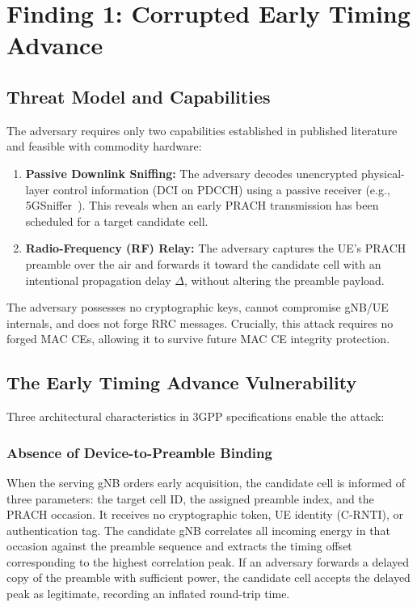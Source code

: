 \chapter{Finding 1: Corrupted Early Timing Advance}
\label{ch:m1}

\section{Threat Model and Capabilities}
\label{sec:threat}

The adversary requires only two capabilities established in published literature and feasible with
commodity hardware:
\begin{enumerate}\itemsep2pt
  \item \textbf{Passive Downlink Sniffing:} The adversary decodes unencrypted physical-layer control
        information (DCI on PDCCH) using a passive receiver (e.g., 5GSniffer~\cite{ludant2023sniffing}).
        This reveals when an early PRACH transmission has been scheduled for a target candidate cell.
  \item \textbf{Radio-Frequency (RF) Relay:} The adversary captures the UE's PRACH preamble over the air
        and forwards it toward the candidate cell with an intentional propagation delay $\Delta$, without
        altering the preamble payload.
\end{enumerate}
The adversary possesses no cryptographic keys, cannot compromise gNB/UE internals, and does not forge
RRC messages. Crucially, this attack requires no forged MAC CEs, allowing it to survive future MAC CE
integrity protection.

\section{The Early Timing Advance Vulnerability}
\label{sec:m1attack}

Three architectural characteristics in 3GPP specifications enable the attack:

\subsection{Absence of Device-to-Preamble Binding}
When the serving gNB orders early \TA{} acquisition, the candidate cell is informed of three parameters:
the target cell ID, the assigned preamble index, and the PRACH occasion. It receives no cryptographic
token, UE identity (C-RNTI), or authentication tag. The candidate gNB correlates all incoming energy
in that occasion against the preamble sequence and extracts the timing offset corresponding to the
highest correlation peak. If an adversary forwards a delayed copy of the preamble with sufficient
power, the candidate cell accepts the delayed peak as legitimate, recording an inflated round-trip time.

